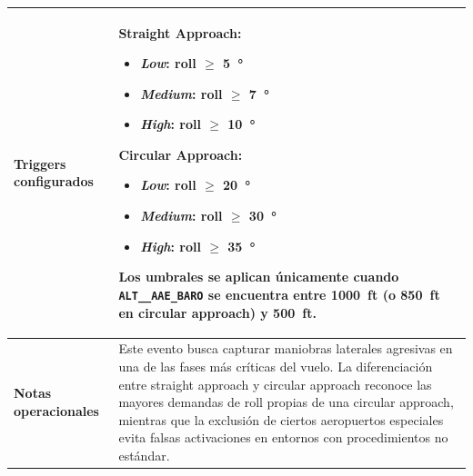 \documentclass[11pt,a4paper]{article}
\begin{document}
\begin{longtable}{p{5cm} p{9.5cm}}
		\\
		\hline
		\textbf{Triggers configurados} &
		\textbf{Straight Approach:}
		\begin{itemize}
			\item \textit{Low}: roll $\geq$ \SI{5}{\degree}
			\item \textit{Medium}: roll $\geq$ \SI{7}{\degree}
			\item \textit{High}: roll $\geq$ \SI{10}{\degree}
		\end{itemize}
		\textbf{Circular Approach:}
		\begin{itemize}
			\item \textit{Low}: roll $\geq$ \SI{20}{\degree}
			\item \textit{Medium}: roll $\geq$ \SI{30}{\degree}
			\item \textit{High}: roll $\geq$ \SI{35}{\degree}
		\end{itemize}
		Los umbrales se aplican únicamente cuando \texttt{ALT\_\_AAE\_BARO} se encuentra entre \SI{1000}{ft} (o \SI{850}{ft} en circular approach) y \SI{500}{ft}. \\
		\hline
		\textbf{Notas operacionales} &
		Este evento busca capturar maniobras laterales agresivas en una de las fases más críticas del vuelo.  
		La diferenciación entre straight approach y circular approach reconoce las mayores demandas de roll propias de una circular approach, mientras que la exclusión de ciertos aeropuertos especiales evita falsas activaciones en entornos con procedimientos no estándar. \\
		\hline
	\end{longtable}
	
\end{document}
